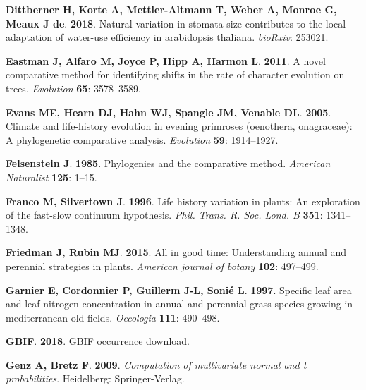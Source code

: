 \documentclass[man,floatsintext]{apa6}
\theoremstyle{definition}
\theoremstyle{definition}
\theoremstyle{definition}
\theoremstyle{remark}
\begin{document}
\leavevmode\hypertarget{ref-dittberner2018natural}{}%
\textbf{\textnormal{Dittberner H}, \textnormal{Korte A},
\textnormal{Mettler-Altmann T}, \textnormal{Weber A}, \textnormal{Monroe
G}, \textnormal{Meaux J de}}. \textbf{2018}. Natural variation in
stomata size contributes to the local adaptation of water-use efficiency
in arabidopsis thaliana. \emph{bioRxiv}: 253021.

\leavevmode\hypertarget{ref-R-geiger_b}{}%
\textbf{\textnormal{Eastman J}, \textnormal{Alfaro M}, \textnormal{Joyce
P}, \textnormal{Hipp A}, \textnormal{Harmon L}}. \textbf{2011}. A novel
comparative method for identifying shifts in the rate of character
evolution on trees. \emph{Evolution} \textbf{65}: 3578--3589.

\leavevmode\hypertarget{ref-evans2005climate}{}%
\textbf{\textnormal{Evans ME}, \textnormal{Hearn DJ}, \textnormal{Hahn
WJ}, \textnormal{Spangle JM}, \textnormal{Venable DL}}. \textbf{2005}.
Climate and life-history evolution in evening primroses (oenothera,
onagraceae): A phylogenetic comparative analysis. \emph{Evolution}
\textbf{59}: 1914--1927.

\leavevmode\hypertarget{ref-felsenstein1985phylogenies}{}%
\textbf{\textnormal{Felsenstein J}}. \textbf{1985}. Phylogenies and the
comparative method. \emph{American Naturalist} \textbf{125}: 1--15.

\leavevmode\hypertarget{ref-franco1996life}{}%
\textbf{\textnormal{Franco M}, \textnormal{Silvertown J}}.
\textbf{1996}. Life history variation in plants: An exploration of the
fast-slow continuum hypothesis. \emph{Phil. Trans. R. Soc. Lond. B}
\textbf{351}: 1341--1348.

\leavevmode\hypertarget{ref-friedman2015all}{}%
\textbf{\textnormal{Friedman J}, \textnormal{Rubin MJ}}. \textbf{2015}.
All in good time: Understanding annual and perennial strategies in
plants. \emph{American journal of botany} \textbf{102}: 497--499.

\leavevmode\hypertarget{ref-garnier1997specific}{}%
\textbf{\textnormal{Garnier E}, \textnormal{Cordonnier P},
\textnormal{Guillerm J-L}, \textnormal{Sonié L}}. \textbf{1997}.
Specific leaf area and leaf nitrogen concentration in annual and
perennial grass species growing in mediterranean old-fields.
\emph{Oecologia} \textbf{111}: 490--498.

\leavevmode\hypertarget{ref-gbifdownload}{}%
\textbf{\textnormal{GBIF}}. \textbf{2018}. GBIF occurrence download.

\leavevmode\hypertarget{ref-R-mvtnorm}{}%
\textbf{\textnormal{Genz A}, \textnormal{Bretz F}}. \textbf{2009}.
\emph{Computation of multivariate normal and t probabilities}.
Heidelberg: Springer-Verlag.
\end{document}
